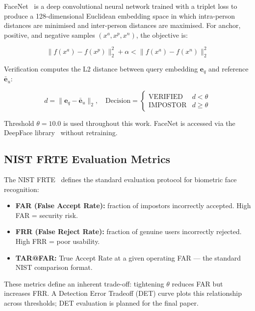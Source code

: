\documentclass[conference]{IEEEtran}
\begin{document}
FaceNet~\cite{schroff2015facenet} is a deep convolutional neural network trained with a triplet loss to produce a 128-dimensional Euclidean embedding space in which intra-person distances are minimised and inter-person distances are maximised. For anchor, positive, and negative samples $(x^a, x^p, x^n)$, the objective is:

\begin{equation}
\|f(x^a) - f(x^p)\|_2^2 + \alpha < \|f(x^a) - f(x^n)\|_2^2
\end{equation}

Verification computes the L2 distance between query embedding $\mathbf{e}_q$ and reference $\bar{\mathbf{e}}_u$:

\begin{equation}
d = \|\mathbf{e}_q - \bar{\mathbf{e}}_u\|_2, \quad
\text{Decision} = \begin{cases} \text{VERIFIED} & d < \theta \\ \text{IMPOSTOR} & d \geq \theta \end{cases}
\end{equation}

Threshold $\theta = 10.0$ is used throughout this work. FaceNet is accessed via the DeepFace library~\cite{serengil2020deepface} without retraining.

\subsection{NIST FRTE Evaluation Metrics}

The NIST FRTE~\cite{nist_frte} defines the standard evaluation protocol for biometric face recognition:

\begin{itemize}
    \item \textbf{FAR (False Accept Rate):} fraction of impostors incorrectly accepted. High FAR = security risk.
    \item \textbf{FRR (False Reject Rate):} fraction of genuine users incorrectly rejected. High FRR = poor usability.
    \item \textbf{TAR@FAR:} True Accept Rate at a given operating FAR — the standard NIST comparison format.
\end{itemize}

These metrics define an inherent trade-off: tightening $\theta$ reduces FAR but increases FRR. A Detection Error Tradeoff (DET) curve plots this relationship across thresholds; DET evaluation is planned for the final paper.
\end{document}
